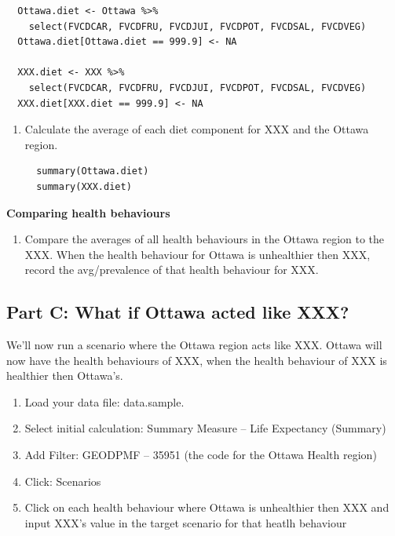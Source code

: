 \documentclass[]{book}
\providecommand{\tightlist}{%
  \setlength{\itemsep}{0pt}\setlength{\parskip}{0pt}}
\begin{document}
\begin{verbatim}
  Ottawa.diet <- Ottawa %>%
    select(FVCDCAR, FVCDFRU, FVCDJUI, FVCDPOT, FVCDSAL, FVCDVEG)
  Ottawa.diet[Ottawa.diet == 999.9] <- NA

  XXX.diet <- XXX %>%
    select(FVCDCAR, FVCDFRU, FVCDJUI, FVCDPOT, FVCDSAL, FVCDVEG)
  XXX.diet[XXX.diet == 999.9] <- NA
\end{verbatim}

\begin{enumerate}
\def\labelenumi{\alph{enumi}.}
\setcounter{enumi}{1}
\item
  Calculate the average of each diet component for XXX and the Ottawa
  region.

\begin{verbatim}
  summary(Ottawa.diet)
  summary(XXX.diet)
\end{verbatim}
\end{enumerate}

\textbf{Comparing health behaviours}

\begin{enumerate}
\def\labelenumi{\arabic{enumi}.}
\setcounter{enumi}{3}
\tightlist
\item
  Compare the averages of all health behaviours in the Ottawa region to
  the XXX. When the health behaviour for Ottawa is unhealthier then XXX,
  record the avg/prevalence of that health behaviour for XXX.
\end{enumerate}

\subsection{Part C: What if Ottawa acted like
XXX?}\label{part-c-what-if-ottawa-acted-like-xxx}

We'll now run a scenario where the Ottawa region acts like XXX. Ottawa
will now have the health behaviours of XXX, when the health behaviour of
XXX is healthier then Ottawa's.

\begin{enumerate}
\def\labelenumi{\arabic{enumi}.}
\item
  Load your data file: data.sample.
\item
  Select initial calculation: Summary Measure -- Life Expectancy
  (Summary)
\item
  Add Filter: GEODPMF -- 35951 (the code for the Ottawa Health region)
\item
  Click: Scenarios
\item
  Click on each health behaviour where Ottawa is unhealthier then XXX
  and input XXX's value in the target scenario for that heatlh behaviour
\end{enumerate}
\end{document}
